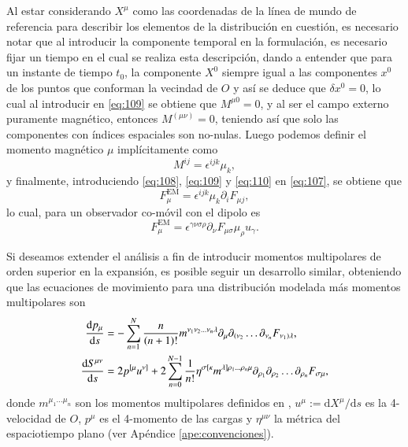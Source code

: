 Al estar considerando $X^{\mu}$ como las coordenadas de la línea de mundo de referencia para describir los elementos de la distribución en cuestión, es necesario notar que al introducir la componente temporal en la formulación, es necesario fijar un tiempo en el cual se realiza esta descripción, dando a entender que para un instante de tiempo $t_0$, la componente $X^0$ siempre igual a las componentes $x^0$ de los puntos que conforman la vecindad de $O$ y así se deduce que $\delta x^0 = 0$, lo cual al introducir en \eqref{eq:109} se obtiene que $M^{\mu 0} = 0$, y al ser el campo externo puramente magnético, entonces $M^{(\mu \nu)} = 0$, teniendo así que solo las componentes con índices espaciales son no-nulas. Luego podemos definir el momento magnético $\mu$ implícitamente como
\begin{equation}
\label{eq:110}
M^{i j} = \epsilon^{i j k} \mu_k,
\end{equation}
y finalmente, introduciendo \eqref{eq:108}, \eqref{eq:109} y \eqref{eq:110} en \eqref{eq:107}, se obtiene que
\begin{equation}
F^{\mathrm{EM}}_{\mu} = \epsilon^{i j k} \mu_k \partial_i F_{\mu j},
\end{equation}
lo cual, para un observador co-móvil con el dipolo es
\begin{equation}
F^{\mathrm{EM}}_{\mu} = \epsilon^{\gamma \nu \sigma \rho} \partial_{\nu} F_{\mu \sigma} \mu_{\rho} u_{\gamma}.
\end{equation}

Si deseamos extender el análisis a fin de introducir momentos multipolares de orden superior en la expansión, es posible seguir un desarrollo similar, obteniendo que las ecuaciones de movimiento para una distribución modelada más momentos multipolares son
\begin{align}
\label{eq:111}
\dv{p_{\mu}}{s} &= -\sum_{n=1}^N \frac{n}{(n+1)!} m^{\nu_1 \nu_2 \dots \nu_n \lambda} \partial_{\mu} \partial_{(\nu_2} \dots \partial_{\nu_n} F_{\nu_1) \lambda},\\
\label{eq:112}
\dv{S^{\mu \nu}}{s} &= 2 p^{[\mu} u^{\nu]} + 2 \sum_{n=0}^{N-1} \frac{1}{n!} \eta^{\sigma [\kappa} m^{\lambda] \rho_1 \dots \rho_n \mu} \partial_{\rho_1} \partial_{\rho_2} \dots \partial_{\rho_n} F_{\sigma \mu},
\end{align}
donde $m^{\mu_1 \dots \mu_n}$ son los momentos multipolares definidos en \cite{Dixon1, Dixon2, Dixon3}, $u^{\mu} := \mathrm{d} X^{\mu} / \mathrm{d}s$ es la 4-velocidad de $O$, $p^{\mu}$ es el 4-momento de las cargas y $\eta^{\mu \nu}$ la métrica del espaciotiempo plano (ver Apéndice \ref{ape:convenciones}).